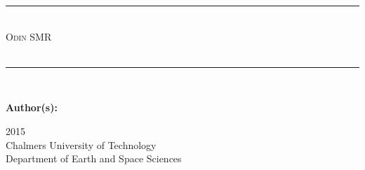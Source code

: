 \begin{titlepage}
\center
\noindent\rule{14cm}{0.4pt} \\
{\huge \scshape Odin SMR \\}
{\Huge\scshape {\bf \CoverTitle}\\[.2in]}
\noindent\rule{14cm}{0.4pt} \\
\begin{flushleft}
{\bf Author(s):} \Authors
\end{flushleft}
2015 \\ Chalmers University of Technology \\ Department of Earth and Space Sciences
\end{titlepage}